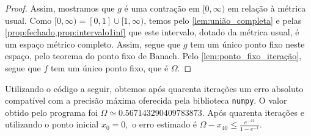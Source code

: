\begin{proof}
    Assim, mostramos que \(g\) é uma contração em \([0, \infty)\) em relação à métrica usual. Como \([0, \infty) = [0,1]\cup[1, \infty)\), temos pelo \cref{lem:união_completa} e pelas \cref{prop:fechado,prop:intervalo1inf} que este intervalo, dotado da métrica usual, é um espaço métrico completo. Assim, segue que \(g\) tem um único ponto fixo neste espaço, pelo teorema do ponto fixo de Banach. Pelo \cref{lem:ponto_fixo_iteração}, segue que \(f\) tem um único ponto fixo, que é \(\Omega\).
\end{proof}

Utilizando o código a seguir, obtemos após quarenta iterações um erro absoluto compatível com a precisão máxima oferecida pela biblioteca \verb|numpy|. O valor obtido pelo programa foi \(\Omega \simeq0.567143290409783873\). Após quarenta iterações e utilizando o ponto inicial \(x_0 = 0,\) o erro estimado é \(\Omega - x_{40} \leq \frac{e^{-41}}{1 - e^{-1}}.\)
\begin{listing}[htbp]
    \inputminted[linenos,fontsize=\footnotesize]{Python}{exercício10.py}
\end{listing}
